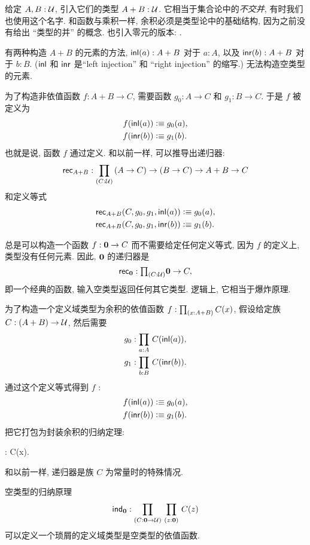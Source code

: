 给定 $A,B:\mathcal{U}$, 引入它们的类型 $A+B:\mathcal{U}$.
%
%
%
%
%
%
它相当于集合论中的\emph{不交并}, 有时我们也使用这个名字.
和函数与乘积一样, 余积必须是类型论中的基础结构, 因为之前没有给出 ``类型的并'' 的概念.
也引入零元的版本: .
%
%
%

有两种构造 $A+B$ 的元素的方法, ${\mathsf{inl}}(a) : A+B$ 对于 $a:A$, 以及 ${\mathsf{inr}}(b):A+B$ 对于 $b:B$.
(${\mathsf{inl}}$ 和 ${\mathsf{inr}}$ 是``left injection'' 和 ``right injection'' 的缩写.)
无法构造空类型的元素.

为了构造非依值函数 $f : A+B \to C$, 需要函数 $g_0 : A \to C$ 和 $g_1 : B \to C$.
于是 $f$ 被定义为
\begin{align*}
    f({\mathsf{inl}}(a)) &\vcentcolon\equiv g_0(a), \\
    f({\mathsf{inr}}(b)) &\vcentcolon\equiv g_1(b).
\end{align*}
也就是说, 函数 $f$ 通过定义.
%
和以前一样, 可以推导出递归器:
%
\[ \rec{A+B} : \dprd{C:\UU}(A \to C) \to (B\to C) \to A+B \to C\]
和定义等式
\begin{align*}
    \mathsf{rec}_{A+B}(C,g_0,g_1,{\mathsf{inl}}(a)) &\vcentcolon\equiv g_0(a), \\
    \mathsf{rec}_{A+B}(C,g_0,g_1,{\mathsf{inr}}(b)) &\vcentcolon\equiv g_1(b).
\end{align*}

总是可以构造一个函数 $f : \mathbf{0} \to C$ 而不需要给定任何定义等式, 因为 $f$ 的定义上, \emptyt 类型没有任何元素.
因此, $\mathbf{0}$ 的递归器是
%
\[\rec{\emptyt} : \tprd{C:\UU} \emptyt \to C,\]
即一个经典的函数, 输入空类型返回任何其它类型.
逻辑上, 它相当于爆炸原理.
%

为了构造一个定义域类型为余积的依值函数 $f:\prd{x:A+B}C(x)$, 假设给定族 $C: (A + B) \to \mathcal{U}$, 然后需要
\begin{align*}
    g_0 &: \prd{a:A} C(\inl(a)), \\
    g_1 &: \prd{b:B} C(\inr(b)).
\end{align*}
通过这个定义等式得到 $f$ :
\begin{align*}
    f({\mathsf{inl}}(a)) &\vcentcolon\equiv g_0(a), \\
    f({\mathsf{inr}}(b)) &\vcentcolon\equiv g_1(b).
\end{align*}
把它打包为封装余积的归纳定理:
%
\begin{narrowmultline*}
     :
     \to \narrowbreak
     \to {}C(x).
\end{narrowmultline*}
和以前一样, 递归器是族 $C$ 为常量时的特殊情况.

空类型的归纳原理
%
\[ \ind{\emptyt} : \prd{C:\emptyt \to \UU}{z:\emptyt} C(z) \]
可以定义一个琐屑的定义域类型是空类型的依值函数.

%
%